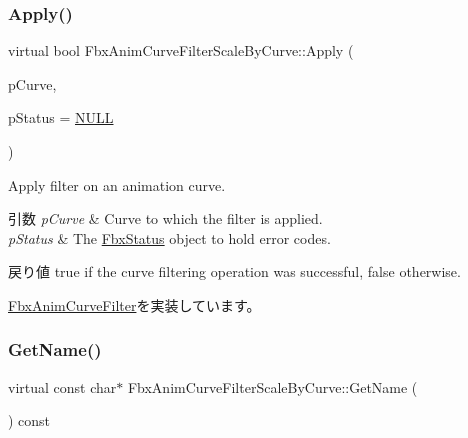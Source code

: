 \subsubsection{\texorpdfstring{Apply()}{Apply()}\hspace{0.1cm}{\footnotesize\ttfamily [5/5]}}
{\footnotesize\ttfamily virtual bool Fbx\+Anim\+Curve\+Filter\+Scale\+By\+Curve\+::\+Apply (\begin{DoxyParamCaption}\item[{\hyperlink{class_fbx_anim_curve}{Fbx\+Anim\+Curve} \&}]{p\+Curve,  }\item[{\hyperlink{class_fbx_status}{Fbx\+Status} $\ast$}]{p\+Status = {\ttfamily \hyperlink{fbxarch_8h_a070d2ce7b6bb7e5c05602aa8c308d0c4}{N\+U\+LL}} }\end{DoxyParamCaption})\hspace{0.3cm}{\ttfamily [virtual]}}

Apply filter on an animation curve. 
\begin{DoxyParams}{引数}
{\em p\+Curve} & Curve to which the filter is applied. \\
\hline
{\em p\+Status} & The \hyperlink{class_fbx_status}{Fbx\+Status} object to hold error codes. \\
\hline
\end{DoxyParams}
\begin{DoxyReturn}{戻り値}
{\ttfamily true} if the curve filtering operation was successful, {\ttfamily false} otherwise. 
\end{DoxyReturn}


\hyperlink{class_fbx_anim_curve_filter_a6a69996c47c0e6f63a0f8b0d5fa806a0}{Fbx\+Anim\+Curve\+Filter}を実装しています。

\mbox{\label{class_fbx_anim_curve_filter_scale_by_curve_a99e99cf6db71774d394010c4cd295fdb}} 
\subsubsection{\texorpdfstring{Get\+Name()}{GetName()}}
{\footnotesize\ttfamily virtual const char$\ast$ Fbx\+Anim\+Curve\+Filter\+Scale\+By\+Curve\+::\+Get\+Name (\begin{DoxyParamCaption}{ }\end{DoxyParamCaption}) const\hspace{0.3cm}{\ttfamily [virtual]}}

